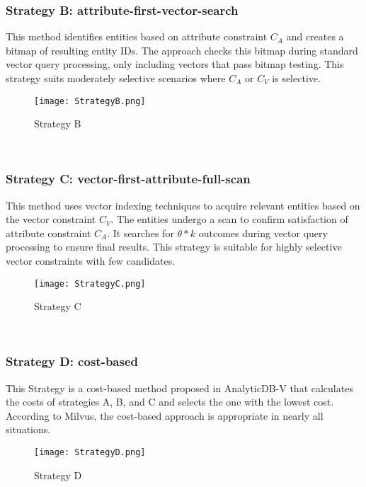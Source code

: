 \documentclass[conference]{IEEEtran}
\begin{document}
\subsubsection{Strategy B: attribute-first-vector-search}\cite{10.1145/3448016.3457550}
This method identifies entities based on attribute constraint $C_A$ and creates a bitmap of resulting entity IDs. The approach checks this bitmap during standard vector query processing, only including vectors that pass bitmap testing. This strategy suits moderately selective scenarios where $C_A$ or $C_V$ is selective.
\begin{figure}[h!]
  \centering
  \texttt{[image: StrategyB.png]}
  \caption{Strategy B}
  \label{fig: Strategy B}
\end{figure}
\\
\subsubsection{Strategy C: vector-first-attribute-full-scan}\cite{10.1145/3448016.3457550}
This method uses vector indexing techniques to acquire relevant entities based on the vector constraint $C_V$. The entities undergo a scan to confirm satisfaction of attribute constraint $C_A$. It searches for $\theta*k$ outcomes during vector query processing to ensure final results. This strategy is suitable for highly selective vector constraints with few candidates.
\begin{figure}[h!]
  \centering
  \texttt{[image: StrategyC.png]}
  \caption{Strategy C}
  \label{fig: Strategy C}
\end{figure}
\\
\subsubsection{Strategy D: cost-based}\cite{10.1145/3448016.3457550}
This Strategy is a cost-based method proposed  in AnalyticDB-V \cite{10.14778/3415478.3415541} that calculates the costs of strategies A, B, and C and selects the one with the lowest cost. According to Milvus, the cost-based approach is appropriate in nearly all situations.
\begin{figure}[h!]
  \centering
  \texttt{[image: StrategyD.png]}
  \caption{Strategy D}
  \label{fig: Strategy D}
\end{figure}
\\
\end{document}
